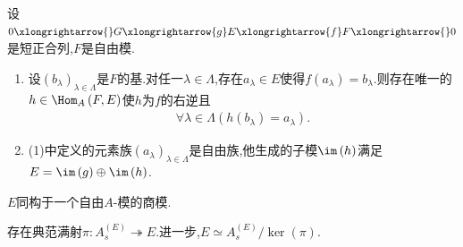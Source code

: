 \begin{corollary}{}{}
	设$0\xlongrightarrow{}G\xlongrightarrow{g}E\xlongrightarrow{f}F\xlongrightarrow{}0$是短正合列,$F$是自由模.
	\begin{enumerate}
		\item 设$\left(b_{\lambda}\right)_{\lambda\in\Lambda}$是$F$的基.对任一$\lambda\in\Lambda$,存在$a_{\lambda}\in E$使得$f\left(a_{\lambda}\right)=b_{\lambda}$.则存在唯一的$h\in\Hom_{A}\left(F,E\right)$使$h$为$f$的右逆且
		\begin{align*}
			\forall\lambda\in\Lambda\left(h\left(b_{\lambda}\right)=a_{\lambda}\right).
		\end{align*}
		\item (1)中定义的元素族$\left(a_{\lambda}\right)_{\lambda\in\Lambda}$是自由族,他生成的子模$\im\left(h\right)$满足$E=\im\left(g\right)\oplus\im\left(h\right)$.
	\end{enumerate}
\end{corollary}

\begin{proposition}{}{}
	$E$同构于一个自由$A$-模的商模.
\end{proposition}

\begin{corollary}{}{}
	存在典范满射$\pi:A_{s}^{\left(E\right)}\twoheadrightarrow E$.进一步,$E\simeq A_{s}^{\left(E\right)}/\ker\left(\pi\right)$.
\end{corollary}


